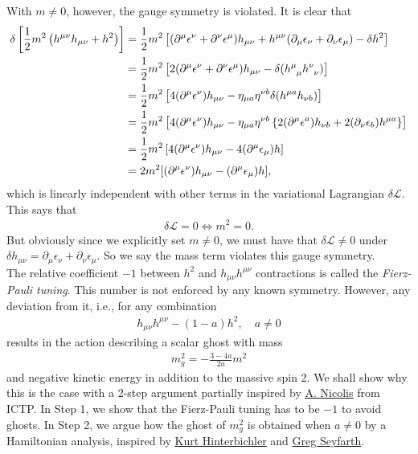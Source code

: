 \documentclass{book}
\theoremstyle{definition}
\newcommand{\p}{\partial}
\newcommand{\lag}{\mathcal{L}}
\newcommand{\nn}{\nonumber}
\newcommand{\f}[2]{\frac{#1}{#2}}
\newcommand{\lp}{\left(}
\newcommand{\rp}{\right)}
\newcommand{\lb}{\left[}
\newcommand{\rb}{\right]}
\newcommand{\lc}{\left\{}
\newcommand{\rc}{\right\}}
\begin{document}
With $m\neq 0$, however, the gauge symmetry is violated. It is clear that
\begin{align}
\delta\lb \f{1}{2}m^2\lp h^{\mu\nu}h_{\mu\nu} + h^2 \rp  \rb &= \f{1}{2}m^2 \lb (\p^\mu \epsilon^\nu + \p^\nu \epsilon^\mu)h_{\mu\nu} + h^{\mu\nu}(\p_\mu\epsilon_\nu + \p_\nu\epsilon_\mu ) - \delta h^2 \rb\nn\\
&= \f{1}{2}m^2\lb 2(\p^\mu \epsilon^\nu + \p^\nu \epsilon^\mu)h_{\mu\nu} - \delta(\tensor{h}{^\mu_\mu}\tensor{h}{^\nu_\nu}) \rb\nn\\
&= \f{1}{2}m^2\lb 4(\p^\mu \epsilon^\nu) h_{\mu\nu} - \eta_{\mu a}\eta^{\nu b}\delta(h^{\mu a}h_{\nu b}) \rb\nn\\
&= \f{1}{2}m^2\lb 4(\p^\mu \epsilon^\nu) h_{\mu\nu} - \eta_{\mu a}\eta^{\nu b}\lc 2(\p^\mu\epsilon^a)h_{\nu b} + 2(\p_\nu \epsilon_b)h^{\mu a}\rc \rb\nn\\
&= \f{1}{2}m^2\lb 4(\p^\mu \epsilon^\nu) h_{\mu\nu} - 4(\p^\mu \epsilon_\mu)h \rb\nn\\
&= 2m^2[(\p^\mu \epsilon^\nu) h_{\mu\nu} - (\p^\mu \epsilon_\mu)h],
\end{align}
which is linearly independent with other terms in the variational Lagrangian $\delta \lag$. This says that
\begin{align}
\delta \lag = 0 \iff m^2 = 0.
\end{align}
But obviously since we explicitly set $m\neq 0$, we must have that $\delta \lag \neq 0$ under $\delta h_{\mu\nu} = \p_\mu \epsilon_\nu + \p_\nu \epsilon_\mu$. So we say the mass term violates this gauge symmetry.\\

The relative coefficient $-1$ between $h^2$ and $h_{\mu\nu}h^{\mu\nu}$ contractions is called the \textit{Fierz-Pauli tuning}. This number is not enforced by any known symmetry. However, any deviation from it, i.e., for any combination
\begin{align}
h_{\mu\nu}h^{\mu\nu} - (1-a)h^2, \quad a \neq 0
\end{align}
results in the action describing a scalar ghost with mass
\begin{align}
\boxed{m_g^2 = -\f{3-4a}{2a}m^2}
\end{align}
and negative kinetic energy in addition to the massive spin 2. We shall show why this is the case with a 2-step argument partially inspired by \href{http://indico.ictp.it/event/a11178/session/6/contribution/3/material/0/0.pdf}{\underline{A. Nicolis}} from ICTP. In Step 1, we show that the Fierz-Pauli tuning has to be $-1$ to avoid ghosts. In Step 2, we argue how the ghost of $m_{g}^2$ is obtained when $a\neq 0$ by a Hamiltonian analysis, inspired by \href{https://arxiv.org/pdf/1105.3735.pdf}{\underline{Kurt Hinterbichler}} and \href{https://digitalcommons.colby.edu/cgi/viewcontent.cgi?article=1721&context=honorstheses}{Greg Seyfarth}. \\
\end{document}
